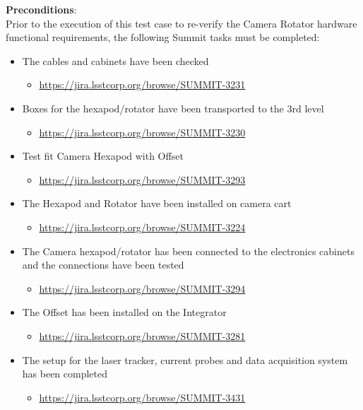 \documentclass[SE,lsstdraft,STR,toc]{lsstdoc}
\providecommand{\tightlist}{
  \setlength{\itemsep}{0pt}\setlength{\parskip}{0pt}}
\begin{document}
\textbf{ Preconditions}:\\
{Prior to the execution of this test case to re-verify the Camera
Rotator hardware functional requirements, the following Summit tasks
must be completed:}

\begin{itemize}
\tightlist
\item
  The cables and cabinets have been checked~

  \begin{itemize}
  \tightlist
  \item
    \url{https://jira.lsstcorp.org/browse/SUMMIT-3231}
  \end{itemize}
\item
  Boxes for the hexapod/rotator have been transported to the 3rd level

  \begin{itemize}
  \tightlist
  \item
    \url{https://jira.lsstcorp.org/browse/SUMMIT-3230}
  \end{itemize}
\item
  Test fit Camera Hexapod with Offset

  \begin{itemize}
  \tightlist
  \item
    \url{https://jira.lsstcorp.org/browse/SUMMIT-3293}
  \end{itemize}
\item
  The Hexapod and Rotator have been installed on camera cart

  \begin{itemize}
  \tightlist
  \item
    \url{https://jira.lsstcorp.org/browse/SUMMIT-3224}
  \end{itemize}
\item
  The Camera hexapod/rotator has been connected to the electronics
  cabinets and the connections have been tested

  \begin{itemize}
  \tightlist
  \item
    \url{https://jira.lsstcorp.org/browse/SUMMIT-3294}
  \end{itemize}
\item
  The Offset has been installed on the Integrator

  \begin{itemize}
  \tightlist
  \item
    \url{https://jira.lsstcorp.org/browse/SUMMIT-3281}
  \end{itemize}
\item
  The setup for the laser tracker, current probes and data acquisition
  system has been completed

  \begin{itemize}
  \tightlist
  \item
    \url{https://jira.lsstcorp.org/browse/SUMMIT-3431}
  \end{itemize}
\end{itemize}
\end{document}
